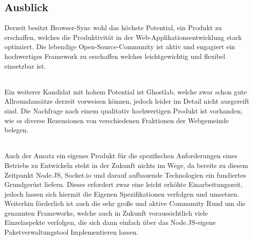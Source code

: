 \subsection{Ausblick}

Derzeit besitzt Browser-Sync wohl das höchste Potential, ein Produkt zu erschaffen, welches die Produktivität in der Web-Applikationsentwicklung stark optimiert. Die lebendige Open-Source-Community ist aktiv und engagiert ein hochwertiges Framework zu erschaffen welches leichtgewichtig und flexibel einsetzbar ist. 

\\ Ein weiterer Kandidat mit hohem Potential ist Ghostlab, welche zwar schon gute Allroundansätze derzeit vorweisen können, jedoch leider im Detail nicht ausgereift sind. Die Nachfrage nach einem qualitativ hochwertigen Produkt ist vorhanden, wie es diverse Rezensionen von verschiedenen Fraktionen der Webgemeinde belegen.

\\ Auch der Ansatz ein eigenes Produkt für die spezifischen Anforderungen eines Betriebs zu Entwickeln steht in der Zukunft nichts im Wege, da bereits zu diesem Zeitpunkt Node.JS, Socket.io und darauf aufbauende Technologien ein fundiertes Grundgerüst liefern. 
Dieses erfordert zwar eine leicht erhöhte Einarbeitungszeit, jedoch lassen sich hiermit die Eigenen Spezifikationen verfolgen und umsetzen. Weiterhin förderlich ist auch die sehr große und aktive Community Rund um die genannten Frameworks, welche auch in Zukunft voraussichtlich viele Einzelaspekte verfolgen, die sich dann einfach über das Node.JS-eigene Paketverwaltungstool Implementieren lassen.